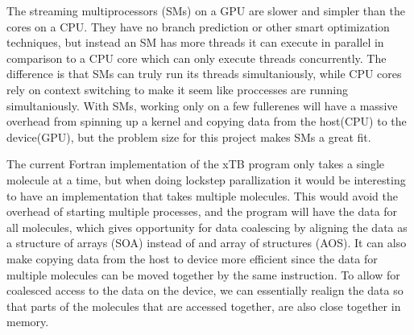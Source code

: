 The streaming multiprocessors (SMs) on a GPU are slower and simpler than the cores on a CPU. They have no branch prediction or other smart optimization techniques, but instead an SM has more threads it can execute in parallel in comparison to a CPU core which can only execute threads concurrently. The difference is that SMs can truly run its threads simultaniously, while CPU cores rely on context switching to make it seem like proccesses are running simultaniously. With SMs, working only on a few fullerenes will have a massive overhead from spinning up a kernel and copying data from the host(CPU) to the device(GPU), but the problem size for this project makes SMs a great fit.

The current Fortran implementation of the xTB program only takes a single molecule at a time, but when doing lockstep parallization it would be interesting to have an implementation that takes multiple molecules. This would avoid the overhead of starting multiple processes, and the program will have the data for all molecules, which gives opportunity for data coalescing by aligning the data as a structure of arrays (SOA) instead of and array of structures (AOS). It can also make copying data from the host to device more efficient since the data for multiple molecules can be moved together by the same instruction. To allow for coalesced access to the data on the device, we can essentially realign the data so that parts of the molecules that are accessed together, are also close together in memory.%

